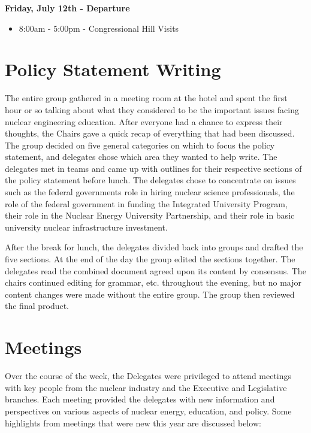 \documentclass[12pt]{article}
\begin{document}
\textbf{Friday, July 12th - Departure}
\begin{itemize}
\item 8:00am - 5:00pm - Congressional Hill Visits
\end{itemize}

\newpage
\section{Policy Statement Writing}

The entire group gathered in a meeting room at the hotel and spent the first
hour or so talking about what they considered to be the important issues facing
nuclear engineering education. After everyone had a chance to express their
thoughts, the Chairs gave a quick recap of everything that had been
discussed. The group decided on five general categories on which to focus the
policy statement, and delegates chose which area they wanted to help write. The
delegates met in teams and came up with outlines for their respective sections
of the policy statement before lunch. The delegates chose to concentrate on
issues such as the federal governments role in hiring nuclear science
professionals, the role of the federal government in funding the Integrated
University Program, their role in the Nuclear Energy University Partnership, and
their role in basic university nuclear infrastructure investment.

After the break for lunch, the delegates divided back into groups and drafted
the five sections. At the end of the day the group edited the sections
together. The delegates read the combined document agreed upon its content by
consensus. The chairs continued editing for grammar, etc. throughout the
evening, but no major content changes were made without the entire group. The
group then reviewed the final product. 


\newpage
\section{Meetings}

Over the course of the week, the Delegates were privileged to attend meetings
with key people from the nuclear industry and the Executive and Legislative
branches.  Each meeting provided the delegates with new information and
perspectives on various aspects of nuclear energy, education, and policy.  Some
highlights from meetings that were new this year are discussed below:\\
\end{document}
